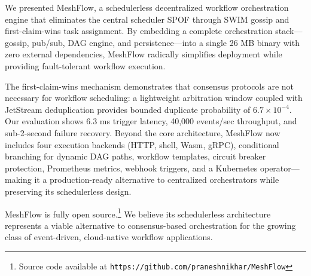 \documentclass[sigconf]{acmart}
\begin{document}
We presented MeshFlow, a schedulerless decentralized workflow orchestration engine that eliminates the central scheduler SPOF through SWIM gossip and first-claim-wins task assignment. By embedding a complete orchestration stack---gossip, pub/sub, DAG engine, and persistence---into a single 26 MB binary with zero external dependencies, MeshFlow radically simplifies deployment while providing fault-tolerant workflow execution.

The first-claim-wins mechanism demonstrates that consensus protocols are not necessary for workflow scheduling: a lightweight arbitration window coupled with JetStream deduplication provides bounded duplicate probability of $6.7 \times 10^{-4}$. Our evaluation shows 6.3 ms trigger latency, 40,000 events/sec throughput, and sub-2-second failure recovery. Beyond the core architecture, MeshFlow now includes four execution backends (HTTP, shell, Wasm, gRPC), conditional branching for dynamic DAG paths, workflow templates, circuit breaker protection, Prometheus metrics, webhook triggers, and a Kubernetes operator---making it a production-ready alternative to centralized orchestrators while preserving its schedulerless design.

MeshFlow is fully open source.\footnote{Source code available at \texttt{https://github.com/praneshnikhar/MeshFlow}} We believe its schedulerless architecture represents a viable alternative to consensus-based orchestration for the growing class of event-driven, cloud-native workflow applications.
\end{document}
